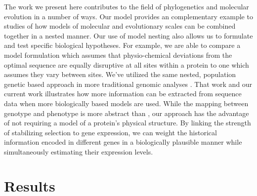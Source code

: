 \documentclass{article}
\begin{document}
The work we present here contributes to the field of phylogenetics and molecular evolution in a number of ways.
Our model provides an complementary example to \citet{ThorneEtAl2012} studies of how models of molecular and evolutionary scales can be combined together in a nested manner.
Our use of model nesting also allows us to formulate and test specific biological hypotheses.
For example, we are able to compare a model formulation which assumes that physio-chemical deviations from the optimal sequence are equally disruptive at all sites within a protein to one which assumes they vary between sites.
We've utilized the same nested, population genetic based approach in more traditional genomic analyses \citep[e.g.][]{Gilchrist2007,ShahAndGilchrist2011,GilchristEtAl2015}.
That work and our current work illustrates how more information can be extracted from sequence data when more biologically based models are used.
While the mapping between genotype and phenotype is more abstract than \citet{ThorneEtAl2012}, our approach has the advantage of not requiring a model of a protein's physical structure.
By linking the strength of stabilizing selection to gene expression,  we can weight the historical information encoded in different genes in a biologically plausible manner while simultaneously estimating their expression levels.




\section*{Results}
\end{document}
